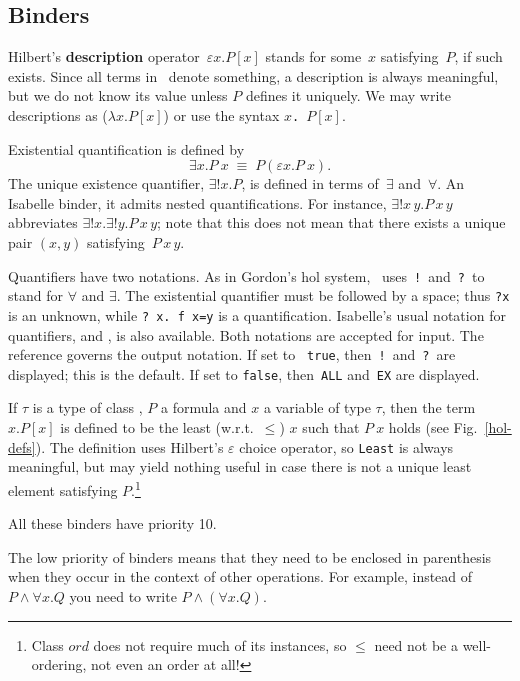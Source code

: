 \subsection{Binders}

Hilbert's {\bf description} operator~$\varepsilon x. P[x]$ stands for
some~$x$ satisfying~$P$, if such exists.  Since all terms in \HOL\ 
denote something, a description is always meaningful, but we do not
know its value unless $P$ defines it uniquely.  We may write
descriptions as ($\lambda x. P[x]$) or use the syntax
\hbox{\tt \at $x$. $P[x]$}.

Existential quantification is defined by
\[ \exists x. P~x \;\equiv\; P(\varepsilon x. P~x). \]
The unique existence quantifier, $\exists!x. P$, is defined in terms
of~$\exists$ and~$\forall$.  An Isabelle binder, it admits nested
quantifications.  For instance, $\exists!x\,y. P\,x\,y$ abbreviates
$\exists!x. \exists!y. P\,x\,y$; note that this does not mean that there
exists a unique pair $(x,y)$ satisfying~$P\,x\,y$.

Quantifiers have two notations.  As in Gordon's {\sc hol} system, \HOL\
uses~{\tt!}\ and~{\tt?}\ to stand for $\forall$ and $\exists$.  The
existential quantifier must be followed by a space; thus {\tt?x} is an
unknown, while \verb'? x. f x=y' is a quantification.  Isabelle's usual
notation for quantifiers, \sdx{ALL} and \sdx{EX}, is also
available.  Both notations are accepted for input.  The {\ML} reference
\ttindexbold{HOL_quantifiers} governs the output notation.  If set to {\tt
true}, then~{\tt!}\ and~{\tt?}\ are displayed; this is the default.  If set
to \texttt{false}, then~{\tt ALL} and~{\tt EX} are displayed.

If $\tau$ is a type of class , $P$ a formula and $x$ a
variable of type $\tau$, then the term ~$x. P[x]$ is defined
to be the least (w.r.t.\ $\le$) $x$ such that $P~x$ holds (see
Fig.~\ref{hol-defs}).  The definition uses Hilbert's $\varepsilon$
choice operator, so \texttt{Least} is always meaningful, but may yield
nothing useful in case there is not a unique least element satisfying
$P$.\footnote{Class $ord$ does not require much of its instances, so
  $\le$ need not be a well-ordering, not even an order at all!}

\medskip All these binders have priority 10.

\begin{warn}
The low priority of binders means that they need to be enclosed in
parenthesis when they occur in the context of other operations.  For example,
instead of $P \land \forall x. Q$ you need to write $P \land (\forall x. Q)$.
\end{warn}


